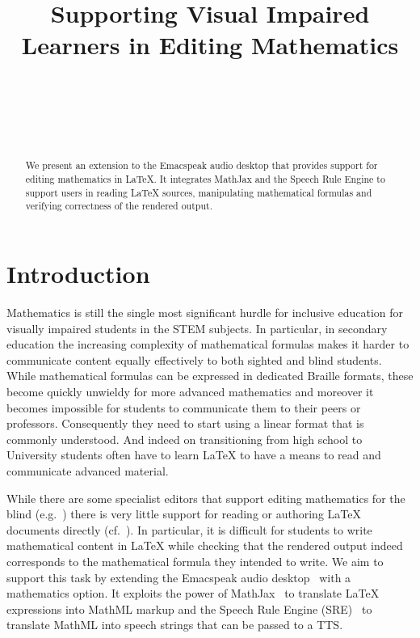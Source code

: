 \documentclass{sig-alternate-05-2015}
\begin{document}
\title{Supporting Visual Impaired Learners in Editing Mathematics}
  

\author{
  \\
  \\
  \\
  \\
}

\maketitle

\begin{abstract}
  We present an extension to the Emacspeak audio desktop that provides support
  for editing mathematics in {\LaTeX}. It integrates MathJax and the Speech Rule
  Engine to support users in reading {\LaTeX} sources, manipulating mathematical
  formulas and verifying correctness of the rendered output.
\end{abstract}



\section{Introduction}


Mathematics is still the single most significant hurdle for inclusive education
for visually impaired students in the STEM subjects. In particular, in secondary
education the increasing complexity of mathematical formulas makes it harder to
communicate content equally effectively to both sighted and blind students.
While mathematical formulas can be expressed in dedicated Braille formats, these
become quickly unwieldy for more advanced mathematics and moreover it becomes
impossible for students to communicate them to their peers or
professors. Consequently they need to start using a linear format that is
commonly understood. And indeed on transitioning from high school to University
students often have to learn {\LaTeX} to have a means to read and communicate
advanced material.

While there are some specialist editors that support editing mathematics for the
blind (e.g.~\cite{Pearson}) there is very little support for reading or
authoring {\LaTeX} documents directly (cf.~\cite{ncbys}). In particular, it is
difficult for students to write mathematical content in {\LaTeX} while checking
that the rendered output indeed corresponds to the mathematical formula they
intended to write. We aim to support this task by extending the Emacspeak audio
desktop~\cite{Emacspeak} with a mathematics option. It exploits the power of
MathJax~\cite{MathJax2.6} to translate {\LaTeX} expressions into MathML markup
and the Speech Rule Engine (SRE)~\cite{SRE} to translate MathML into speech
strings that can be passed to a TTS.
\end{document}
